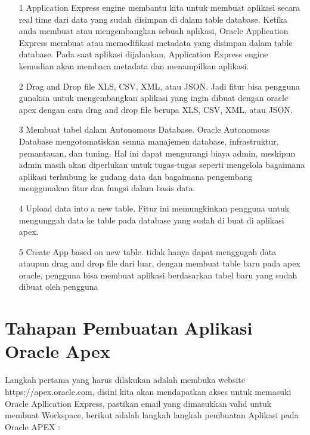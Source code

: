 \begin{enumerate}

\item[1]Application Express engine membantu kita untuk membuat aplikasi secara real time dari data yang sudah disimpan di dalam table database. Ketika anda membuat atau mengembangkan sebuah aplikasi, Oracle Application Express membuat atau memodifikasi metadata yang disimpan dalam table database. Pada saat aplikasi dijalankan, Application Express engine kemudian akan membaca metadata dan menampilkan aplikasi.

\item[2]Drag and Drop file XLS, CSV, XML, atau JSON.
Jadi fitur bisa pengguna gunakan untuk mengembangkan aplikasi yang ingin dibuat dengan oracle apex dengan cara drag and drop file berupa XLS, CSV, XML, atau JSON.
    

\item[3]Membuat tabel dalam Autonomous Database. Oracle Autonomous Database mengotomatiskan semua manajemen database, infrastruktur, pemantauan, dan tuning. Hal ini dapat mengurangi biaya admin, meskipun admin masih akan diperlukan untuk tugas-tugas seperti mengelola bagaimana aplikasi terhubung ke gudang data dan bagaimana pengembang menggunakan fitur dan fungsi dalam basis data.


\item[4]Upload data into a new table. Fitur ini memungkinkan pengguna untuk mengunggah data ke table pada database yang sudah di buat di aplikasi apex.

\item[5]Create App based on new table. tidak hanya dapat menggugah data ataupun drag and drop file dari luar, dengan membuat table baru pada apex oracle, pengguna bisa membuat aplikasi berdasarkan tabel baru yang sudah dibuat oleh pengguna  


\end{enumerate}

\section{Tahapan Pembuatan Aplikasi Oracle Apex}
Langkah pertama yang harus dilakukan adalah membuka website https://apex.oracle.com, disini kita akan mendapatkan akses untuk memasuki Oracle Apllication Express, pastikan email yang dimasukkan valid untuk membuat Workspace, berikut adalah langkah langkah pembuatan Aplikasi pada Oracle APEX :

